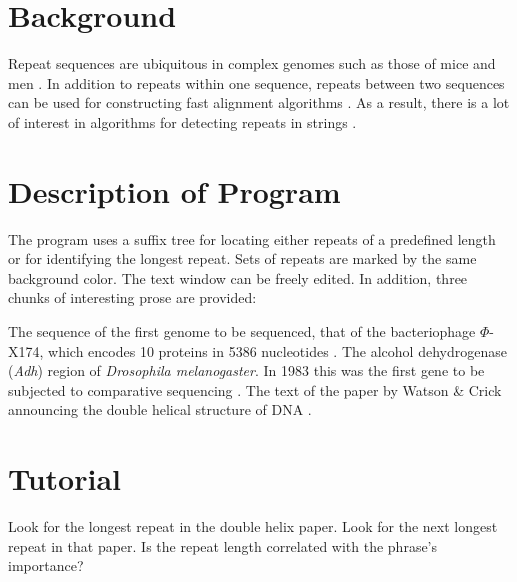 \section{Background}
Repeat sequences are ubiquitous in complex genomes such as those of
mice \cite{msc02:ini} and men \cite{int01:ini}. In addition to repeats
within one sequence, repeats between two sequences can be used for
constructing fast alignment algorithms \cite{del99:ali}. As a result,
there is a lot of interest in algorithms for detecting repeats in
strings \cite{gus97:alg}. 


\section{Description of Program}
The program uses a suffix tree for locating either repeats of a
predefined length or for identifying the longest repeat. Sets of
repeats are marked by the same background color. The text window can
be freely edited. In addition, three chunks of 
interesting prose are provided:
\begin{enumerate}
  \I The sequence of the first genome to be sequenced, that of the
  bacteriophage $\Phi$-X174, which encodes 10
  proteins in 5386 nucleotides \cite{air78:nuc}.
  \I The alcohol dehydrogenase (\textit{Adh}) region of
  \textit{Drosophila melanogaster}. In 1983 this was the first gene to
  be subjected to comparative sequencing \cite{kre83:nuc}. 
  \I The text of the paper by Watson \& Crick announcing the
  double helical structure of DNA \cite{wat53:mol}.
\end{enumerate}

\section{Tutorial}
\begin{itemize}
  \I Look for the longest repeat in the double helix paper.
  \I Look for the next longest repeat in that paper. Is the repeat
  length correlated with the phrase's importance?
\end{itemize}






